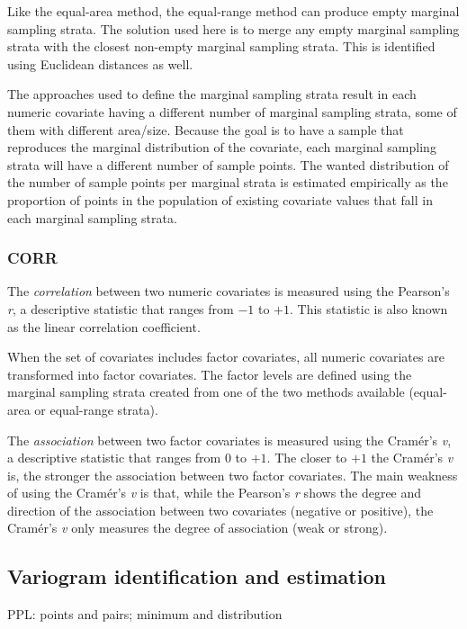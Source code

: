 Like the equal-area method, the equal-range method can produce empty marginal
sampling strata. The solution used here is to merge any empty marginal 
sampling strata with the closest non-empty marginal sampling strata. This is
identified using Euclidean distances as well.

The approaches used to define the marginal sampling strata result in each 
numeric covariate having a different number of marginal sampling strata, 
some of them with different area/size. Because the goal is to have a sample 
that reproduces the marginal distribution of the covariate, each marginal 
sampling strata will have a different number of sample points. The wanted 
distribution of the number of sample points per marginal strata is estimated 
empirically as the proportion of points in the population of existing 
covariate values that fall in each marginal sampling strata.

\subsubsection{CORR}

The \textit{correlation} between two numeric covariates is measured using the 
Pearson's \textit{r}, a descriptive statistic that ranges from $-1$ to $+1$. 
This statistic is also known as the linear correlation coefficient.

When the set of covariates includes factor covariates, all numeric covariates 
are transformed into factor covariates. The factor levels are defined 
using the marginal sampling strata created from one of the two methods 
available (equal-area or equal-range strata).

The \textit{association} between two factor covariates is measured using the 
Cramér's \textit{v}, a descriptive statistic that ranges from $0$ to $+1$. The 
closer to $+1$ the Cramér's \textit{v} is, the stronger the association between 
two factor covariates. The main weakness of using the Cramér's \textit{v} is 
that, while the Pearson's \textit{r} shows the degree and direction of the 
association between two covariates (negative or positive), the Cramér's 
\textit{v} only measures the degree of association (weak or strong).

\subsection{Variogram identification and estimation}

PPL: points and pairs; minimum and distribution

